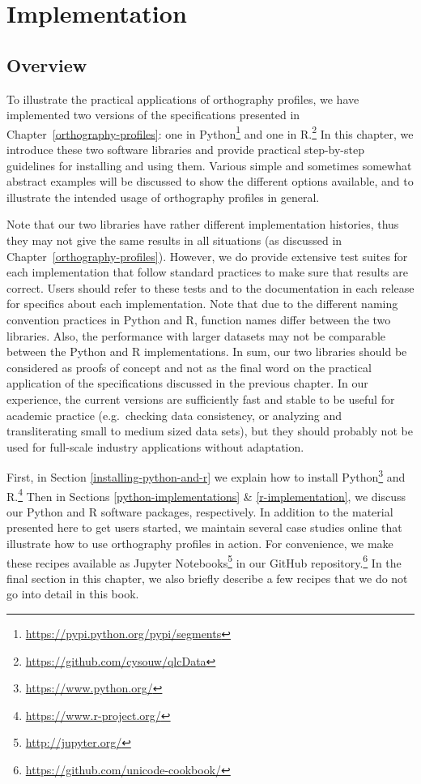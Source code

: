 \chapter{Implementation}
\label{implementation}

\section{Overview}
To illustrate the practical applications of orthography profiles, we have implemented two versions of the specifications presented in Chapter~\ref{orthography-profiles}: one in Python\footnote{\url{https://pypi.python.org/pypi/segments}} and one in R.\footnote{\url{https://github.com/cysouw/qlcData}} In this chapter, we introduce these two software libraries and provide practical step-by-step guidelines for installing and using them. Various simple and sometimes somewhat abstract examples will be discussed to show the different options available, and to illustrate the intended usage of orthography profiles in general. 

Note that our two libraries have rather different implementation histories, thus they may not give the same results in all situations (as discussed in Chapter~\ref{orthography-profiles}). However, we do provide extensive test suites for each implementation that follow standard practices to make sure that results are correct. Users should refer to these tests and to the documentation in each release for specifics about each implementation. Note that due to the different naming convention practices in Python and R, function names differ between the two libraries. Also, the performance with larger datasets may not be comparable between the Python and R implementations. In sum, our two libraries should be considered as proofs of concept and not as the final word on the practical application of the specifications discussed in the previous chapter. In our experience, the current versions are sufficiently fast and stable to be useful for academic practice (e.g.\ checking data consistency, or analyzing and transliterating small to medium sized data sets), but they should probably not be used for full-scale industry applications without adaptation.

First, in Section \ref{installing-python-and-r} we explain how to install Python\footnote{\url{https://www.python.org/}} and R.\footnote{\url{https://www.r-project.org/}} Then in Sections \ref{python-implementations} \& \ref{r-implementation}, we discuss our Python and R software packages, respectively. In addition to the material presented here to get users started, we maintain several case studies online that illustrate how to use orthography profiles in action. For convenience, we make these recipes available as Jupyter Notebooks\footnote{\url{http://jupyter.org/}} in our GitHub repository.\footnote{\url{https://github.com/unicode-cookbook/}} In the final section in this chapter, we also briefly describe a few recipes that we do not go into detail in this book.


